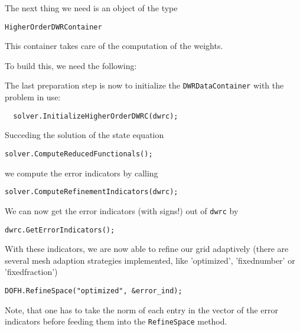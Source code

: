 The next thing we need is an object of the type
\begin{verbatim}
HigherOrderDWRContainer
\end{verbatim}
This container takes care of the computation of the weights.

To build this, we need the following:
The last preparation step is now to initialize the \texttt{DWRDataContainer} with the problem in use:
\begin{verbatim}
  solver.InitializeHigherOrderDWRC(dwrc);
\end{verbatim}

Succeding the solution of the state equation 
\begin{verbatim}
solver.ComputeReducedFunctionals(); 
\end{verbatim}
we compute the error indicators by calling 
\begin{verbatim}
solver.ComputeRefinementIndicators(dwrc);
\end{verbatim}
We can now get the error indicators (with signs!) out of \texttt{dwrc} by 
\begin{verbatim}
dwrc.GetErrorIndicators();
\end{verbatim}
With these indicators, we are now able to refine our grid adaptively (there are several mesh adaption strategies implemented, like 'optimized', 'fixednumber' or 'fixedfraction')
\begin{verbatim}
DOFH.RefineSpace("optimized", &error_ind);
\end{verbatim}
Note, that one has to take the norm of each entry in the vector of the error indicators before feeding them into the \texttt{RefineSpace} method.
